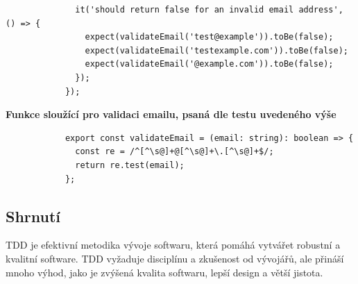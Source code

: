 \documentclass{article}
\begin{document}
\begin{Test Driven Development}
\begin{verbatim}
              it('should return false for an invalid email address', () => {
                expect(validateEmail('test@example')).toBe(false);
                expect(validateEmail('testexample.com')).toBe(false);
                expect(validateEmail('@example.com')).toBe(false);
              });
            });
        \end{verbatim}

        \textbf{\large Funkce sloužící pro validaci emailu, psaná dle testu uvedeného výše}
        \begin{verbatim}
            export const validateEmail = (email: string): boolean => {
              const re = /^[^\s@]+@[^\s@]+\.[^\s@]+$/;
              return re.test(email);
            };
        \end{verbatim}

        \subsection{Shrnutí}\label{subsec:shrnuti}
        TDD je efektivní metodika vývoje softwaru, která pomáhá vytvářet robustní a kvalitní software.
        TDD vyžaduje disciplínu a zkušenost od vývojářů, ale přináší mnoho výhod, jako je zvýšená kvalita softwaru, lepší design a větší jistota.

    \end{Test Driven Development}

    \break
\end{document}
